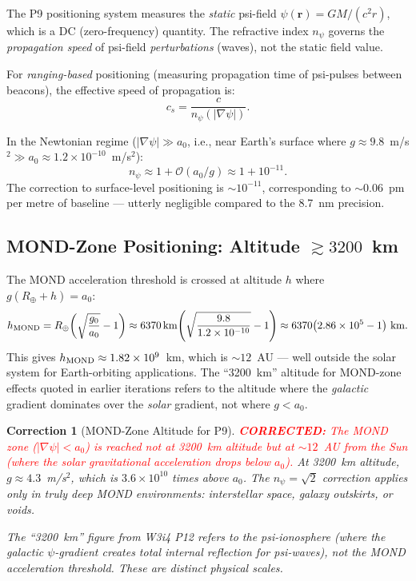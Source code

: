 \documentclass[aps,prd,twocolumn,superscriptaddress,nofootinbib]{revtex4-2}
\newcommand{\order}[1]{\mathcal{O}(#1)}
\newcommand{\corrected}[1]{\textcolor{red}{\textbf{CORRECTED:} #1}}
\newtheorem{correction}{Correction}
\begin{document}
The P9 positioning system measures the \emph{static} psi-field
$\psi(\mathbf{r}) = GM/(c^2 r)$, which is a DC (zero-frequency)
quantity. The refractive index $n_\psi$ governs the \emph{propagation
speed} of psi-field \emph{perturbations} (waves), not the static field
value.

For \emph{ranging-based} positioning (measuring propagation time of
psi-pulses between beacons), the effective speed of propagation is:
\begin{equation}
c_s = \frac{c}{n_\psi(|\nabla\psi|)}.
\label{eq:cs}
\end{equation}

In the Newtonian regime ($|\nabla\psi| \gg a_0$, i.e., near Earth's
surface where $g \approx 9.8$~m/s$^2 \gg a_0 \approx 1.2\times10^{-10}$~m/s$^2$):
\begin{equation}
n_\psi \approx 1 + \order{a_0/g} \approx 1 + 10^{-11}.
\label{eq:npsi-surface}
\end{equation}
The correction to surface-level positioning is $\sim 10^{-11}$,
corresponding to $\sim 0.06$~pm per metre of baseline --- utterly
negligible compared to the 8.7~nm precision.

\subsection{MOND-Zone Positioning: Altitude $\gtrsim 3200$~km}

The MOND acceleration threshold is crossed at altitude $h$ where
$g(R_\oplus + h) = a_0$:
\begin{equation}
h_{\rm MOND} = R_\oplus\!\left(\sqrt{\frac{g_0}{a_0}} - 1\right)
\approx 6370\,\mathrm{km}\!\left(\sqrt{\frac{9.8}{1.2\times10^{-10}}} - 1\right)
\approx 6370\!\left(2.86\times10^5 - 1\right)\,\mathrm{km}.
\label{eq:h-mond}
\end{equation}
This gives $h_{\rm MOND} \approx 1.82\times10^9$~km, which is
$\sim 12$~AU --- well outside the solar system for Earth-orbiting
applications. The ``3200~km'' altitude for MOND-zone effects quoted
in earlier iterations refers to the altitude where the \emph{galactic}
gradient dominates over the \emph{solar} gradient, not where $g < a_0$.

\begin{correction}[MOND-Zone Altitude for P9]
\label{corr:mond-zone}
\corrected{The MOND zone ($|\nabla\psi| < a_0$) is reached not at
3200~km altitude but at $\sim 12$~AU from the Sun (where the solar
gravitational acceleration drops below $a_0$).} At 3200~km altitude,
$g \approx 4.3$~m/s$^2$, which is $3.6\times10^{10}$ times above $a_0$.
The $n_\psi = \sqrt{2}$ correction applies only in truly deep MOND
environments: interstellar space, galaxy outskirts, or voids.

The ``3200~km'' figure from W3i4 P12 refers to the psi-ionosphere
(where the \emph{galactic} $\psi$-gradient creates total internal
reflection for psi-waves), not the MOND acceleration threshold.
These are distinct physical scales.
\end{correction}
\end{document}
